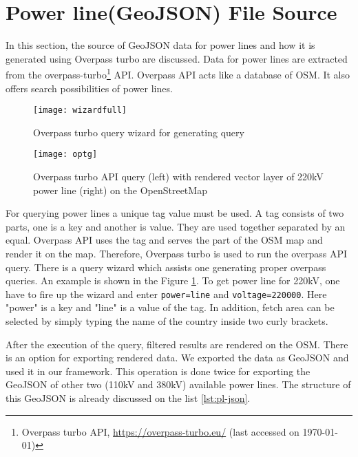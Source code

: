 \section{Power line(GeoJSON) File Source}
\label{sec:plsource}

In this section, the source of GeoJSON data for power lines and how it is generated using Overpass turbo are discussed.
Data for power lines are extracted from the overpass-turbo\footnote{Overpass turbo API, \url{https://overpass-turbo.eu/} (last accessed on {\today})} API. Overpass API acts like a database of OSM. It also offers search possibilities of power lines. 

\begin{figure}
  \begin{center}
    \texttt{[image: wizardfull]}
    \caption{Overpass turbo query wizard for generating query}
    \label{fig:wizard}
  \end{center}
\end{figure} 

\begin{figure}
  \begin{center}
    \texttt{[image: optg]}
    \caption[Overpass turbo API]{Overpass turbo API query (left) with rendered vector layer of 220kV power line (right) on the OpenStreetMap}
    \label{fig:optg}
  \end{center}
\end{figure} 

For querying power lines a unique tag value must be used. A tag consists of two parts, one is a key and another is value. They are used together separated by an equal. Overpass API uses the tag and serves the part of the OSM map and render it on the map. Therefore, Overpass turbo is used to run the overpass API query. There is a query wizard which assists one generating proper overpass queries. An example is shown in the Figure \ref{fig:wizard}. To get power line for 220kV, one have to fire up the wizard and enter \texttt{power=line} and \texttt{voltage=220000}. Here "power" is a key and "line" is a value of the tag. In addition, fetch area can be selected by simply typing the name of the country inside two curly brackets.
  
After the execution of the query, filtered results are rendered on the OSM. There is an option for exporting rendered data. We exported the data as GeoJSON and used it in our framework. This operation is done twice for exporting the GeoJSON of other two (110kV and 380kV) available power lines. The structure of this GeoJSON is already discussed on the list \ref{lst:pl-json}.

 